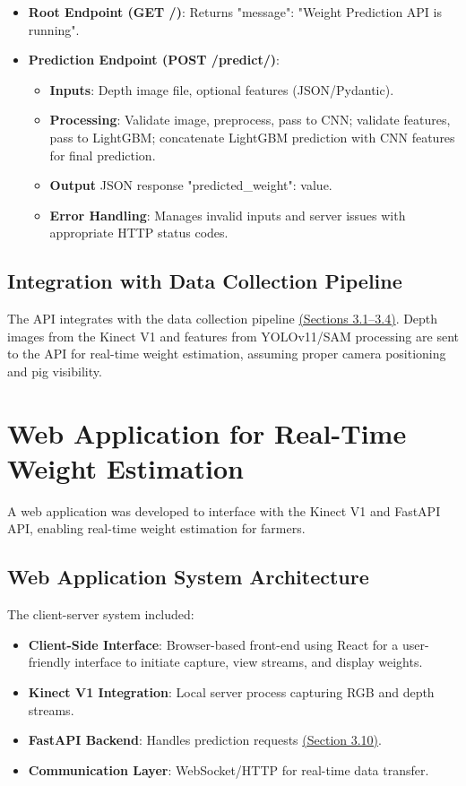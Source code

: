 {\begin{itemize}
	\item \textbf{Root Endpoint (GET /)}: Returns {"message": "Weight Prediction API is running"}.
	\item \textbf{Prediction Endpoint (POST /predict/)}:
	\begin{itemize}
		\item \textbf{Inputs}: Depth image file, optional features (JSON/Pydantic).
		\item \textbf{Processing}: Validate image, preprocess, pass to CNN; validate features, pass to LightGBM; concatenate LightGBM prediction with CNN features for final prediction.
		\item \textbf{Output} JSON response {"predicted\_weight": value}.
		\item \textbf{Error Handling}: Manages invalid inputs and server issues with appropriate HTTP status codes.
	\end{itemize}
\end{itemize}

\subsection{Integration with Data Collection Pipeline}

The API integrates with the data collection pipeline \hyperref[Section 3.1]{(Sections 3.1–3.4)}. Depth images from the Kinect V1 and features from YOLOv11/SAM processing are sent to the API for real-time weight estimation, assuming proper camera positioning and pig visibility.

\section{Web Application for Real-Time Weight Estimation}
A web application was developed to interface with the Kinect V1 and FastAPI API, enabling real-time weight estimation for farmers.

\subsection{Web Application System Architecture}

The client-server system included:

\begin{itemize}
	\item \textbf{Client-Side Interface}: Browser-based front-end using React for a user-friendly interface to initiate capture, view streams, and display weights.
	\item \textbf{Kinect V1 Integration}: Local server process capturing RGB and depth streams.
	\item \textbf{FastAPI Backend}: Handles prediction requests \hyperref[Section 3.10]{(Section 3.10)}.
	\item \textbf{Communication Layer}: WebSocket/HTTP for real-time data transfer.
\end{itemize}

}
